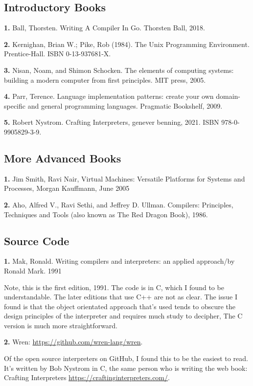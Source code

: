 \subsection*{Introductory Books}

{\bf 1.} Ball, Thorsten. Writing A Compiler In Go. Thorsten Ball, 2018.

{\bf 2.} Kernighan, Brian W.; Pike, Rob (1984). The Unix Programming Environment. Prentice-Hall. ISBN 0-13-937681-X.

{\bf 3.} Nisan, Noam, and Shimon Schocken. The elements of computing systems: building a modern computer from first principles. MIT press, 2005.

{\bf 4.} Parr, Terence. Language implementation patterns: create your own domain-specific and general programming languages. Pragmatic Bookshelf, 2009.

{\bf 5.} Robert Nystrom. Crafting Interpreters, genever benning, 2021. ISBN 978-0-9905829-3-9.

\subsection*{More Advanced Books}

{\bf 1.} Jim Smith, Ravi Nair, Virtual Machines: Versatile Platforms for Systems and Processes, Morgan Kauffmann, June 2005

{\bf 2.} Aho, Alfred V., Ravi Sethi, and Jeffrey D. Ullman. Compilers: Principles, Techniques and Tools (also known as The Red Dragon Book), 1986.

\subsection*{Source Code}

{\bf 1.} Mak, Ronald. Writing compilers and interpreters: an applied approach/by Ronald Mark. 1991

Note, this is the first edition, 1991. The code is in C, which I found to be understandable. The later editions that use C++ are not as clear. The issue I found is that the object orientated approach that's used tends to obscure the design principles of the interpreter and requires much study to decipher, The C version is much more straightforward.

{\bf 2.} Wren: \url{https://github.com/wren-lang/wren}.

Of the open source interpreters on GitHub, I found this to be the easiest to read. It's written by Bob Nystrom in C, the same person who is writing the web book: Crafting Interpreters \url{https://craftinginterpreters.com/}.

